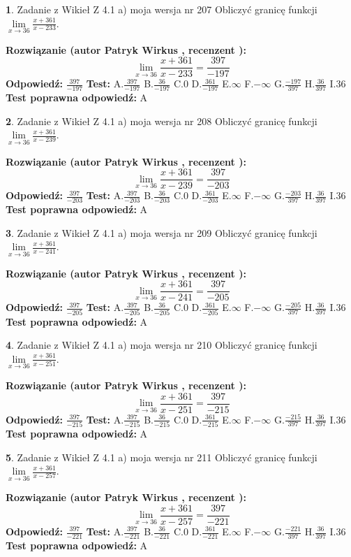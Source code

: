 \documentclass[12pt, a4paper]{article}
\theoremstyle{definition} %
\newtheorem{zad}{}
\newcommand{\zadStart}[1]{\begin{zad}#1\newline}
\newcommand{\zadStop}{\end{zad}}
\newcommand{\rozwStart}[2]{\noindent \textbf{Rozwiązanie (autor #1 , recenzent #2): }\newline}
\newcommand{\rozwStop}{\newline}
\newcommand{\odpStart}{\noindent \textbf{Odpowiedź:}\newline}
\newcommand{\odpStop}{\newline}
\newcommand{\testStart}{\noindent \textbf{Test:}\newline}
\newcommand{\testStop}{\newline}
\newcommand{\kluczStart}{\noindent \textbf{Test poprawna odpowiedź:}\newline}
\newcommand{\kluczStop}{\newline}
\begin{document}
\zadStart{Zadanie z Wikieł Z 4.1 a) moja wersja nr 207}
Obliczyć granicę funkcji $\lim\limits_{x\to36}\frac{x+361}{x-233}$.
\zadStop
\rozwStart{Patryk Wirkus}{}
$$\lim\limits_{x\to36}\frac{x+361}{x-233} = \frac{397}{-197}$$
\rozwStop
\odpStart
$\frac{397}{-197}$
\odpStop
\testStart
A.$\frac{397}{-197}$
B.$\frac{36}{-197}$
C.$0$
D.$\frac{361}{-197}$
E.$\infty$
F.$-\infty$
G.$\frac{-197}{397}$
H.$\frac{36}{397}$
I.$36$
\testStop
\kluczStart
A
\kluczStop



\zadStart{Zadanie z Wikieł Z 4.1 a) moja wersja nr 208}
Obliczyć granicę funkcji $\lim\limits_{x\to36}\frac{x+361}{x-239}$.
\zadStop
\rozwStart{Patryk Wirkus}{}
$$\lim\limits_{x\to36}\frac{x+361}{x-239} = \frac{397}{-203}$$
\rozwStop
\odpStart
$\frac{397}{-203}$
\odpStop
\testStart
A.$\frac{397}{-203}$
B.$\frac{36}{-203}$
C.$0$
D.$\frac{361}{-203}$
E.$\infty$
F.$-\infty$
G.$\frac{-203}{397}$
H.$\frac{36}{397}$
I.$36$
\testStop
\kluczStart
A
\kluczStop



\zadStart{Zadanie z Wikieł Z 4.1 a) moja wersja nr 209}
Obliczyć granicę funkcji $\lim\limits_{x\to36}\frac{x+361}{x-241}$.
\zadStop
\rozwStart{Patryk Wirkus}{}
$$\lim\limits_{x\to36}\frac{x+361}{x-241} = \frac{397}{-205}$$
\rozwStop
\odpStart
$\frac{397}{-205}$
\odpStop
\testStart
A.$\frac{397}{-205}$
B.$\frac{36}{-205}$
C.$0$
D.$\frac{361}{-205}$
E.$\infty$
F.$-\infty$
G.$\frac{-205}{397}$
H.$\frac{36}{397}$
I.$36$
\testStop
\kluczStart
A
\kluczStop



\zadStart{Zadanie z Wikieł Z 4.1 a) moja wersja nr 210}
Obliczyć granicę funkcji $\lim\limits_{x\to36}\frac{x+361}{x-251}$.
\zadStop
\rozwStart{Patryk Wirkus}{}
$$\lim\limits_{x\to36}\frac{x+361}{x-251} = \frac{397}{-215}$$
\rozwStop
\odpStart
$\frac{397}{-215}$
\odpStop
\testStart
A.$\frac{397}{-215}$
B.$\frac{36}{-215}$
C.$0$
D.$\frac{361}{-215}$
E.$\infty$
F.$-\infty$
G.$\frac{-215}{397}$
H.$\frac{36}{397}$
I.$36$
\testStop
\kluczStart
A
\kluczStop



\zadStart{Zadanie z Wikieł Z 4.1 a) moja wersja nr 211}
Obliczyć granicę funkcji $\lim\limits_{x\to36}\frac{x+361}{x-257}$.
\zadStop
\rozwStart{Patryk Wirkus}{}
$$\lim\limits_{x\to36}\frac{x+361}{x-257} = \frac{397}{-221}$$
\rozwStop
\odpStart
$\frac{397}{-221}$
\odpStop
\testStart
A.$\frac{397}{-221}$
B.$\frac{36}{-221}$
C.$0$
D.$\frac{361}{-221}$
E.$\infty$
F.$-\infty$
G.$\frac{-221}{397}$
H.$\frac{36}{397}$
I.$36$
\testStop
\kluczStart
A
\kluczStop
\end{document}

